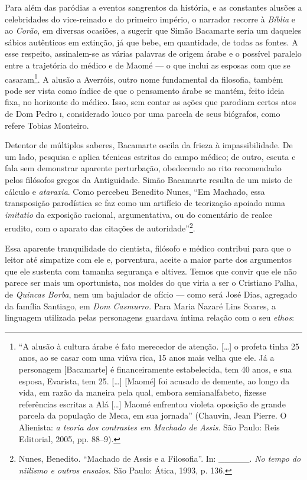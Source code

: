 Para além das paródias a eventos sangrentos da história, e as constantes
alusões a celebridades do vice-reinado e do primeiro império, o narrador
recorre à \emph{Bíblia} e ao \emph{Corão}, em diversas ocasiões, a
sugerir que Simão Bacamarte seria um daqueles sábios autênticos em
extinção, já que bebe, em quantidade, de todas as fontes. A esse
respeito, assinalem-se as várias palavras de origem árabe e o possível
paralelo entre a trajetória do médico e de Maomé --- o que inclui as
esposas com que se casaram\footnote{``A alusão à cultura árabe é fato
  merecedor de atenção. {[}\ldots{}{]} o profeta tinha 25 anos, ao se
  casar com uma viúva rica, 15 anos mais velha que ele. Já a personagem
  {[}Bacamarte{]} é financeiramente estabelecida, tem 40 anos, e sua
  esposa, Evarista, tem 25. {[}\ldots{}{]} {[}Maomé{]} foi acusado de
  demente, ao longo da vida, em razão da maneira pela qual, embora
  semianalfabeto, fizesse referências escritas a Alá {[}\ldots{}{]}
  Maomé enfrentou violeta oposição de grande parcela da população de
  Meca, em sua jornada'' (Chauvin, Jean Pierre. O Alienista: \emph{a
  teoria dos contrastes em Machado de Assis}. São Paulo: Reis Editorial,
  2005, pp. 88--9).}. A alusão a Averróis, outro nome fundamental da
filosofia, também pode ser vista como índice de que o pensamento árabe
se mantém, feito ideia fixa, no horizonte do médico. Isso, sem contar as
ações que parodiam certos atos de Dom Pedro \textsc{i}, considerado louco por uma
parcela de seus biógrafos, como refere Tobias Monteiro.

Detentor de múltiplos saberes, Bacamarte oscila da frieza à
impassibilidade. De um lado, pesquisa e aplica técnicas estritas do
campo médico; de outro, escuta e fala sem demonstrar aparente
perturbação, obedecendo ao rito recomendado pelos filósofos gregos da
Antiguidade. Simão Bacamarte resulta de um misto de cálculo e
\emph{ataraxia}. Como percebeu Benedito Nunes, ``Em Machado, essa
transposição parodística se faz como um artifício de teorização apoiado
numa \emph{imitatio} da exposição racional, argumentativa, ou do
comentário de realce erudito, com o aparato das citações de
autoridade''\footnote{Nunes, Benedito. ``Machado de Assis e a
  Filosofia''. In: \_\_\_\_\_. \emph{No tempo do niilismo e outros
  ensaios}. São Paulo: Ática, 1993, p. 136.}.

Essa aparente tranquilidade do cientista, filósofo e médico contribui
para que o leitor até simpatize com ele e, porventura, aceite a maior
parte dos argumentos que ele sustenta com tamanha segurança e altivez.
Temos que convir que ele não parece ser mais um oportunista, nos moldes
do que viria a ser o Cristiano Palha, de \emph{Quincas Borba}, nem um
bajulador de ofício --- como será José Dias, agregado da família
Santiago, em \emph{Dom Casmurro.} Para Maria Nazaré Lins Soares, a
linguagem utilizada pelas personagens guardava íntima relação com o seu
\emph{ethos}:

